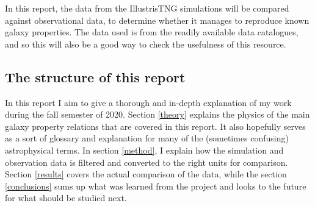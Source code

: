 In this report, the data from the IllustrisTNG simulations will be compared against observational data, to determine whether it manages to reproduce known galaxy properties. The data used is from the readily available data catalogues, and so this will also be a good way to check the usefulness of this resource.


\subsection{The structure of this report}
In this report I aim to give a thorough and in-depth explanation of my work during the fall semester of 2020. Section \ref{theory} explains the physics of the main galaxy property relations that are covered in this report. It also hopefully serves as a sort of glossary and explanation for many of the (sometimes confusing) astrophysical terms. In section \ref{method}, I explain how the simulation and observation data is filtered and converted to the right units for comparison. Section \ref{results} covers the actual comparison of the data, while the section \ref{conclusions} sums up what was learned from the project and looks to the future for what should be studied next.